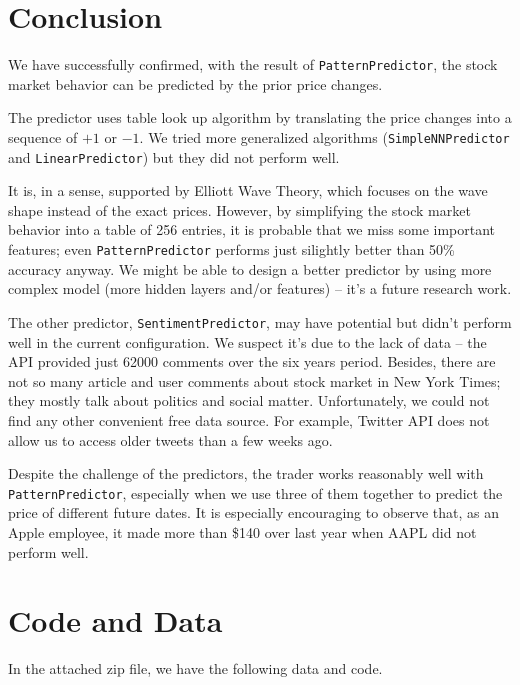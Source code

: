 \documentclass[twocolumn,10pt]{asme2ej}
\begin{document}
\section{Conclusion}

We have successfully confirmed, with the result of \verb|PatternPredictor|, the
stock market behavior can be predicted by the prior price changes.

The predictor uses table look up algorithm by translating the price
changes into a sequence of $+1$ or $-1$. We tried more generalized
algorithms (\verb|SimpleNNPredictor| and \verb|LinearPredictor|) but
they did not perform well.

It is, in a sense, supported by Elliott Wave Theory, which focuses on
the wave shape instead of the exact prices. However, by simplifying
the stock market behavior into a table of 256 entries, it is probable
that we miss some important features; even \verb|PatternPredictor|
performs just silightly better than 50\% accuracy anyway. We might be
able to design a better predictor by using more complex model (more
hidden layers and/or features) -- it's a future research work.

The other predictor, \verb|SentimentPredictor|, may have potential but
didn't perform well in the current configuration. We suspect it's due
to the lack of data -- the API provided just 62000 comments over the
six years period. Besides, there are not so many article and user
comments about stock market in New York Times; they mostly talk about
politics and social matter. Unfortunately, we could not find any other
convenient free data source. For example, Twitter API does not allow
us to access older tweets than a few weeks ago.

Despite the challenge of the predictors, the trader works reasonably
well with \verb|PatternPredictor|, especially when we use three of
them together to predict the price of different future dates. It is
especially encouraging to observe that, as an Apple employee, it made
more than \$140 over last year when AAPL did not perform well.


\section{Code and Data}

In the attached zip file, we have the following data and code.
\end{document}
